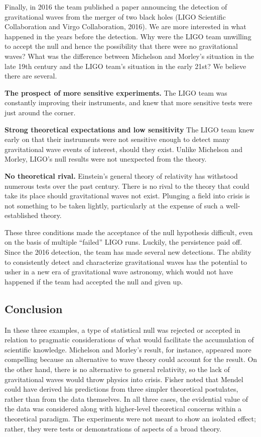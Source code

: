 \documentclass[english,floatsintext,man]{apa6}
\theoremstyle{definition}
\theoremstyle{definition}
\theoremstyle{definition}
\theoremstyle{remark}
\begin{document}
Finally, in 2016 the team published a paper announcing the detection of
gravitational waves from the merger of two black holes (LIGO Scientific
Collaboration and Virgo Collaboration, 2016). We are more interested in
what happened in the years before the detection. Why were the LIGO team
unwilling to accept the null and hence the possibility that there were
no gravitational waves? What was the difference between Michelson and
Morley's situation in the late 19th century and the LIGO team's
situation in the early 21st? We believe there are several.

\textbf{The prospect of more sensitive experiments.} The LIGO team was
constantly improving their instruments, and knew that more sensitive
tests were just around the corner.

\textbf{Strong theoretical expectations and low sensitivity} The LIGO
team knew early on that their instruments were not sensitive enough to
detect many gravitational wave events of interest, should they exist.
Unlike Michelson and Morley, LIGO's null results were not unexpected
from the theory.

\textbf{No theoretical rival.} Einstein's general theory of relativity
has withstood numerous tests over the past century. There is no rival to
the theory that could take its place should gravitational waves not
exist. Plunging a field into crisis is not something to be taken
lightly, particularly at the expense of such a well-established theory.

These three conditions made the acceptance of the null hypothesis
difficult, even on the basis of multiple \enquote{failed} LIGO runs.
Luckily, the persistence paid off. Since the 2016 detection, the team
has made several new detections. The ability to consistently detect and
characterize gravitational waves has the potential to usher in a new era
of gravitational wave astronomy, which would not have happened if the
team had accepted the null and given up.

\hypertarget{conclusion}{%
\subsection{Conclusion}\label{conclusion}}

In these three examples, a type of statistical null was rejected or
accepted in relation to pragmatic considerations of what would
facilitate the accumulation of scientific knowledge. Michelson and
Morley's result, for instance, appeared more compelling because an
alternative to wave theory could account for the result. On the other
hand, there is no alternative to general relativity, so the lack of
gravitational waves would throw physics into crisis. Fisher noted that
Mendel could have derived his predictions from three simpler theoretical
postulates, rather than from the data themselves. In all three cases,
the evidential value of the data was considered along with higher-level
theoretical concerns within a theoretical paradigm. The experiments were
not meant to show an isolated effect; rather, they were tests or
demonstrations of aspects of a broad theory.
\end{document}
